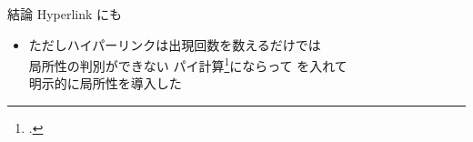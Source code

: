 \begin{frame}{結論}
  Hyperlink にも 

  \begin{itemize}
  \item
    ただしハイパーリンクは出現回数を数えるだけでは\\
    局所性の判別ができない
    \thusitem
    パイ計算\footcite{pi}にならって \mfbox{\nu} を入れて\\
    明示的に局所性を導入した
  \end{itemize}
\end{frame}

